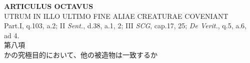 \documentclass[paper=a4paper,fontsize=10pt,jafontsize=9pt,titlepage]{jlreq}
\begin{document}
\newpage





{}
\setcounter{section}{8}
\setcounter{subsection}{0}
\begin{center}
 {\Large {\bfseries ARTICULUS OCTAVUS}}\\
 {\large UTRUM IN ILLO ULTIMO FINE ALIAE CREATURAE COVENIANT}\\
 {\footnotesize Part.I, q.103, a.2; II {\itshape Sent.}, d.38, a.1, 2;
 III {\itshape SCG}, cap.17, 25; {\itshape De Verit.}, q.5, a.6, ad 4.}\\
 {\Large 第八項\\かの究極目的において、他の被造物は一致するか}
\end{center}
\end{document}
